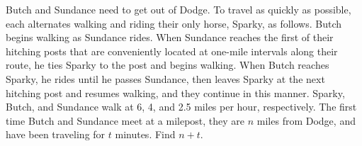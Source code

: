 Butch and Sundance need to get out of Dodge. To travel as quickly as possible, each alternates walking and riding their only horse, Sparky, as follows. Butch begins walking as Sundance rides. When Sundance reaches the first of their hitching posts that are conveniently located at one-mile intervals along their route, he ties Sparky to the post and begins walking. When Butch reaches Sparky, he rides until he passes Sundance, then leaves Sparky at the next hitching post and resumes walking, and they continue in this manner. Sparky, Butch, and Sundance walk at 6, 4, and 2.5 miles per hour, respectively. The first time Butch and Sundance meet at a milepost, they are $n$ miles from Dodge, and have been traveling for $t$ minutes. Find $n + t$.